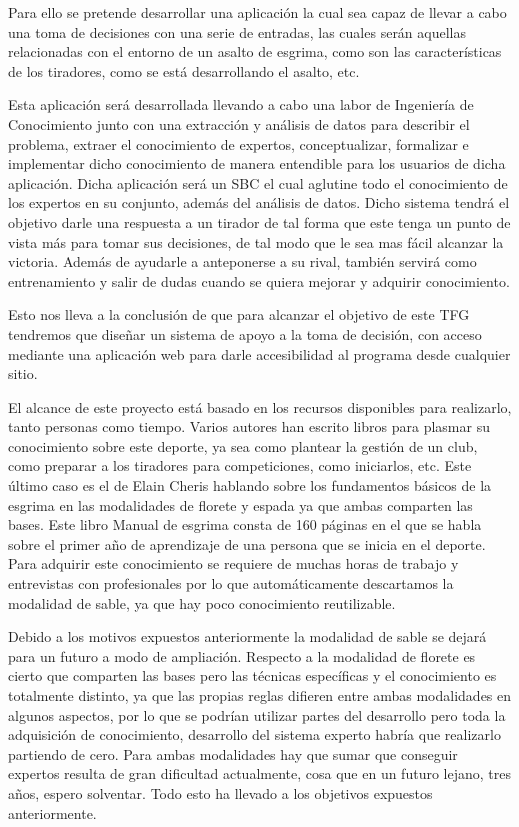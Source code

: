 Para ello se pretende desarrollar una aplicación la cual sea capaz de llevar a
 cabo una toma de decisiones con una serie de entradas, las cuales serán aquellas
 relacionadas con el entorno de un asalto de esgrima, como son las características
 de los tiradores, como se está desarrollando el asalto, etc.

Esta aplicación será desarrollada llevando a cabo una labor de Ingeniería de Conocimiento
 junto con una extracción y análisis de datos para describir el problema, extraer
 el conocimiento de expertos, conceptualizar, formalizar e implementar dicho conocimiento
 de manera entendible para los usuarios de dicha aplicación. Dicha aplicación será un SBC
 el cual aglutine todo el conocimiento de los expertos en su conjunto, además del análisis
 de datos. Dicho sistema tendrá el objetivo darle una respuesta a un tirador de tal forma
 que este tenga un punto de vista más para tomar sus decisiones, de tal modo que le sea mas
 fácil alcanzar la victoria. Además de ayudarle a anteponerse a su rival, también servirá
 como entrenamiento y salir de dudas cuando se quiera mejorar y adquirir conocimiento.

Esto nos lleva a la conclusión de que para alcanzar el objetivo de este TFG tendremos
 que diseñar un sistema de apoyo a la toma de decisión, con acceso mediante una aplicación
 web para darle accesibilidad al programa desde cualquier sitio.

El alcance de este proyecto está basado en los recursos disponibles para realizarlo, tanto personas como tiempo.
 Varios autores han escrito libros para plasmar su conocimiento sobre este deporte,
 ya sea como plantear la gestión de un club, como preparar a los tiradores para competiciones,
 como iniciarlos, etc. Este último caso es el de Elain Cheris hablando sobre los fundamentos
 básicos de la esgrima en las modalidades de florete y espada ya que ambas comparten
 las bases. Este libro Manual de esgrima \cite{manualdeesgrima} consta de 160 páginas en el que se habla sobre
 el primer año de aprendizaje de una persona que se inicia en el deporte. Para adquirir
 este conocimiento se requiere de muchas horas de trabajo y entrevistas con profesionales
 por lo que automáticamente descartamos la modalidad de sable, ya que hay poco conocimiento
 reutilizable.

Debido a los motivos expuestos anteriormente la modalidad de sable se dejará para un futuro
 a modo de ampliación. Respecto a la modalidad de florete es cierto que comparten
 las bases pero las técnicas específicas y el conocimiento es totalmente distinto,
 ya que las propias reglas difieren entre ambas modalidades en algunos aspectos,
 por lo que se podrían utilizar partes del desarrollo pero toda la adquisición de
 conocimiento, desarrollo del sistema experto habría que realizarlo partiendo de cero.
 Para ambas modalidades hay que sumar que conseguir expertos resulta de gran dificultad
 actualmente, cosa que en un futuro lejano, tres años, espero solventar. Todo esto ha
 llevado a los objetivos expuestos anteriormente.

